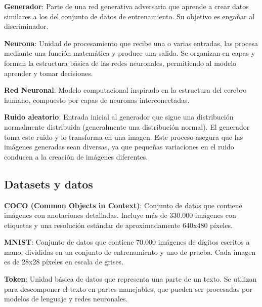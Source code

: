 \vspace{5mm}

\textbf{Generador}: Parte de una red generativa adversaria que aprende a crear datos similares a los del conjunto de datos de entrenamiento. Su objetivo es engañar al discriminador.

\vspace{5mm}

\textbf{Neurona}: Unidad de procesamiento que recibe una o varias entradas, las procesa mediante una función matemática y produce una salida. Se organizan en capas y forman la estructura básica de las redes neuronales, permitiendo al modelo aprender y tomar decisiones.

\vspace{5mm}

\textbf{Red Neuronal}: Modelo computacional inspirado en la estructura del cerebro humano, compuesto por capas de neuronas interconectadas.

\vspace{5mm}

\textbf{Ruido aleatorio}: Entrada inicial al generador que sigue una distribución normalmente distribuida (generalmente una distribución normal). El generador toma este ruido y lo transforma en una imagen. Este proceso asegura que las imágenes generadas sean diversas, ya que pequeñas variaciones en el ruido conducen a la creación de imágenes diferentes.

\vspace{5mm}


\subsection{Datasets y datos}
\textbf{COCO (Common Objects in Context)}: Conjunto de datos que contiene imágenes con anotaciones detalladas. Incluye más de 330.000 imágenes con etiquetas y una resolución estándar de aproximadamente 640x480 píxeles.

\vspace{5mm}

\textbf{MNIST}: Conjunto de datos que contiene 70.000 imágenes de dígitos escritos a mano, divididas en un conjunto de entrenamiento y uno de prueba. Cada imagen es de 28x28 píxeles en escala de grises.

\vspace{5mm}

\textbf{Token}: Unidad básica de datos que representa una parte de un texto. Se utilizan para descomponer el texto en partes manejables, que pueden ser procesadas por modelos de lenguaje y redes neuronales.

